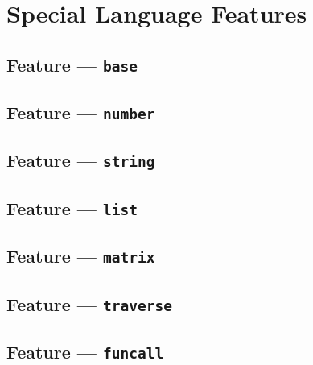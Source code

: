 

\section{Special Language Features} %
\label{sec:special_language_features}

\subsection{Feature --- \texttt{base}} %
\label{sub:feature_base}


\subsection{Feature --- \texttt{number}} %
\label{sub:feature_number}


\subsection{Feature --- \texttt{string}} %
\label{sub:feature_string}


\subsection{Feature --- \texttt{list}} %
\label{sub:feature_list}


\subsection{Feature --- \texttt{matrix}} %
\label{sub:feature_matrix}


\subsection{Feature --- \texttt{traverse}} %
\label{sub:feature_traverse}


\subsection{Feature --- \texttt{funcall}} %
\label{sub:feature_funcall}



